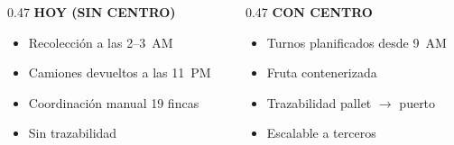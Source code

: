 \documentclass[aspectratio=169, 10pt]{beamer}
\begin{document}
\begin{frame}
\vspace{4pt}
\begin{columns}[T]
\begin{column}{0.47\textwidth}
    {\scriptsize\color{rojo}\textbf{HOY (SIN CENTRO)}}
    \begin{itemize}\scriptsize
        \setlength\itemsep{-2pt}
        \item[\textcolor{rojo}{\scriptsize$\blacksquare$}] Recolecci\'on a las 2--3~AM
        \item[\textcolor{rojo}{\scriptsize$\blacksquare$}] Camiones devueltos a las 11~PM
        \item[\textcolor{rojo}{\scriptsize$\blacksquare$}] Coordinaci\'on manual 19 fincas
        \item[\textcolor{rojo}{\scriptsize$\blacksquare$}] Sin trazabilidad
    \end{itemize}
\end{column}
\begin{column}{0.47\textwidth}
    {\scriptsize\color{verde}\textbf{CON CENTRO}}
    \begin{itemize}\scriptsize
        \setlength\itemsep{-2pt}
        \item Turnos planificados desde 9~AM
        \item Fruta contenerizada
        \item Trazabilidad pallet $\rightarrow$ puerto
        \item Escalable a terceros
    \end{itemize}
\end{column}
\end{columns}
\end{frame}
\end{document}
